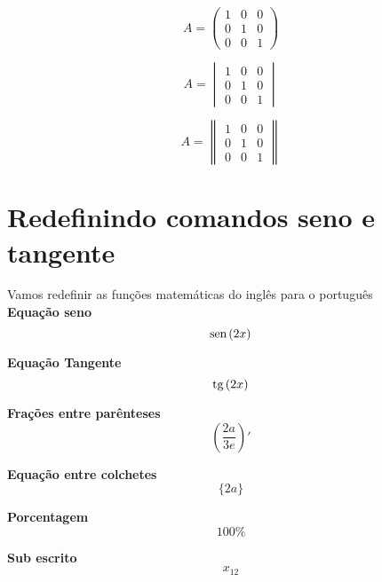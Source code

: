 \documentclass{article}
\renewcommand{\sin}{\mathrm{sen\hspace{0.5mm}}}
\renewcommand{\tan}{\mathrm{tg\hspace{0.5mm}}}
\begin{document}
    \begin{equation*}
	    A = \begin{pmatrix}
	    1 & 0 & 0  \\
	    0 & 1 & 0  \\
	    0 & 0 & 1
	    \end{pmatrix}    	
    \end{equation*}
    
    \begin{equation*}
	    A = \begin{vmatrix}
	    1 & 0 & 0  \\
	    0 & 1 & 0  \\
	    0 & 0 & 1
	    \end{vmatrix}    	
    \end{equation*}
    
    \begin{equation*}
	    A = \begin{Vmatrix}
	    1 & 0 & 0  \\
	    0 & 1 & 0  \\
	    0 & 0 & 1
	    \end{Vmatrix}    	
    \end{equation*}
    
    \section{Redefinindo comandos seno e tangente}
    
    Vamos redefinir as funções matemáticas do inglês para o português\\
    
   \textbf{ Equação seno}
    \begin{equation*}
    	\sin(2x)
    \end{equation*}

    \textbf{Equação Tangente}
    \begin{equation*}
    \tan(2x)
    \end{equation*}
    
    \textbf{Frações entre parênteses}
    \begin{equation*}
    	\left(\frac{2a}{3e}\right)'
    \end{equation*}
    
   \textbf{ Equação entre colchetes}
    \begin{equation*}
    	\{2a\}
    \end{equation*}
    
    \textbf{Porcentagem}
    \begin{equation*}
    100 \%
    \end{equation*}
    
    \textbf{Sub escrito }
	\begin{equation*}
	x_{12}
	\end{equation*}
	
\end{document}
